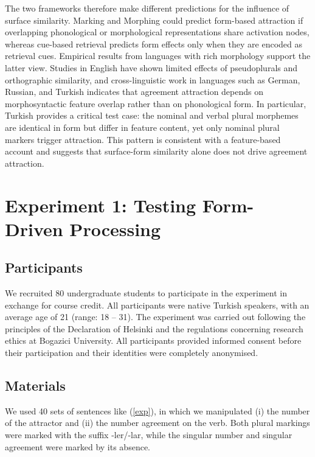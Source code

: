 \documentclass[
  authoryear,
  3p]{elsarticle}
\begin{document}
The two frameworks therefore make different predictions for the
influence of surface similarity. Marking and Morphing could predict
form-based attraction if overlapping phonological or morphological
representations share activation nodes, whereas cue-based retrieval
predicts form effects only when they are encoded as retrieval cues.
Empirical results from languages with rich morphology support the latter
view. Studies in English have shown limited effects of pseudoplurals and
orthographic similarity, and cross-linguistic work in languages such as
German, Russian, and Turkish indicates that agreement attraction depends
on morphosyntactic feature overlap rather than on phonological form. In
particular, Turkish provides a critical test case: the nominal and
verbal plural morphemes are identical in form but differ in feature
content, yet only nominal plural markers trigger attraction. This
pattern is consistent with a feature-based account and suggests that
surface-form similarity alone does not drive agreement attraction.

\section{Experiment 1: Testing Form-Driven
Processing}\label{experiment-1-testing-form-driven-processing}

\subsection{Participants}\label{participants}

We recruited 80 undergraduate students to participate in the experiment
in exchange for course credit. All participants were native Turkish
speakers, with an average age of 21 (range: 18 -- 31). The experiment
was carried out following the principles of the Declaration of Helsinki
and the regulations concerning research ethics at Bogazici University.
All participants provided informed consent before their participation
and their identities were completely anonymised.

\subsection{Materials}\label{materials}

We used 40 sets of sentences like (\ref{exp}), in which we manipulated
(i) the number of the attractor and (ii) the number agreement on the
verb. Both plural markings were marked with the suffix -ler/-lar, while
the singular number and singular agreement were marked by its absence.
\end{document}
